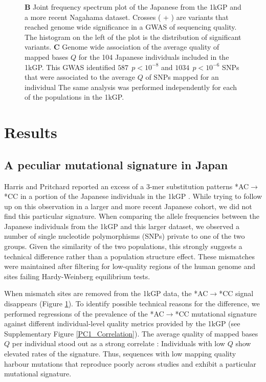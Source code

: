 \documentclass[9pt,lineno]{elife}
\newcommand{\sgcomment}[1]{\textcolor{blue}{SG: #1}}
\begin{document}
\begin{figure}
{\textbf{B} 
Joint frequency spectrum plot of the Japanese from the 1kGP and a more recent Nagahama dataset.
Crosses ( + ) are variants that reached genome wide significance in a GWAS of sequencing quality. 
The histogram on the left of the plot is the distribution of significant variants. 
\textbf{C} 
Genome wide association of the average quality of mapped bases $Q$ for the 104 Japanese individuals included in the 1kGP. This GWAS identified $587\ \  p < 10^{-8}$ and $1034\ \ p < 10^{-6}$ SNPs that were associated to the average $Q$ of SNPs mapped for an individual
The same analysis was performed independently for each of the populations in the 1kGP. }
 \label{SFS}
\end{figure}


\section{Results}

			
\subsection{A peculiar mutational signature in Japan}			
	
Harris and Pritchard reported an excess of a 3-mer substitution patterns *AC${\rightarrow}$*CC in a portion of the Japanese individuals in the 1kGP \citep{Harris2017a}.
While trying to follow up on this observation in a larger and more recent Japanese cohort, we did not find this particular signature.
When comparing the allele frequencies between the Japanese individuals from the 1kGP and this larger dataset, we observed a number of single nucleotide polymorphisms (SNPs) private to one of the two groups.
Given the similarity of the two populations, this strongly suggests a technical difference rather than a population structure effect.
These mismatches were maintained after filtering for low-quality regions of the human genome and sites failing Hardy-Weinberg equilibrium tests. 


When mismatch sites are removed from the 1kGP data, the  *AC${\rightarrow}$*CC signal disappears (Figure \ref{SFS}). To identify possible technical reasons for the difference, we performed regressions of the prevalence of the  *AC${\rightarrow}$*CC mutational signature against different individual-level quality metrics provided by the 1kGP (see Supplementary Figure \ref{PC1_Correlation}). The average quality of mapped bases  $Q$ per individual stood out as a strong correlate : Individuals with low $Q$ show elevated rates of the signature. %
Thus, sequences with low mapping quality harbour mutations that reproduce poorly across studies and exhibit a particular mutational signature. 
\end{document}
